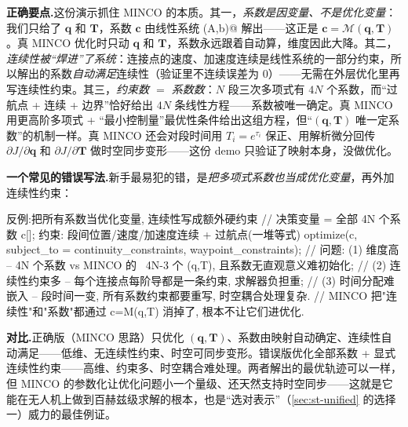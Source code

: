 \noindent\textbf{正确要点.}\;这份演示抓住 MINCO 的本质。其一，\emph{系数是因变量、不是优化变量}：我们只给了 $\mathbf q$ 和 $\mathbf T$，系数 $\mathbf c$ 由线性系统 \verb@Solve(A,b)@ 解出——这正是 $\mathbf c=\mathcal M(\mathbf q,\mathbf T)$。真 MINCO 优化时只动 $\mathbf q$ 和 $\mathbf T$，系数永远跟着自动算，维度因此大降。其二，\emph{连续性被“焊进”了系统}：连接点的速度、加速度连续是线性系统的一部分约束，所以解出的系数\emph{自动满足}连续性（验证里不连续误差为 $0$）——无需在外层优化里再写连续性约束。其三，\emph{约束数 $=$ 系数数}：$N$ 段三次多项式有 $4N$ 个系数，而“过航点 + 连续 + 边界”恰好给出 $4N$ 条线性方程——系数被唯一确定。真 MINCO 用更高阶多项式 + “最小控制量”最优性条件给出这组方程，但“$(\mathbf q,\mathbf T)$ 唯一定系数”的机制一样。真 MINCO 还会对段时间用 $T_i=e^{\tau_i}$ 保正、用解析微分回传 $\partial J/\partial\mathbf q$ 和 $\partial J/\partial\mathbf T$ 做时空同步变形——这份 demo 只验证了映射本身，没做优化。

\noindent{}\textbf{一个常见的错误写法.}\;新手最易犯的错，是\emph{把多项式系数也当成优化变量}，再外加连续性约束：

\begin{codebox}[C++]{反例:把所有系数当优化变量, 连续性写成额外硬约束}
// 决策变量 = 全部 4N 个系数 c[]; 约束: 段间位置/速度/加速度连续 + 过航点(一堆等式)
optimize(c, subject_to = {continuity_constraints, waypoint_constraints});
// 问题: (1) 维度高 -- 4N 个系数 vs MINCO 的 ~4N-3 个 (q,T), 且系数无直观意义难初始化;
//       (2) 连续性约束多 -- 每个连接点每阶导都是一条约束, 求解器负担重;
//       (3) 时间分配难嵌入 -- 段时间一变, 所有系数约束都要重写, 时空耦合处理复杂.
//       MINCO 把"连续性"和"系数"都通过 c=M(q,T) 消掉了, 根本不让它们进优化.
\end{codebox}

\noindent\textbf{对比.}\;正确版（MINCO 思路）只优化 $(\mathbf q,\mathbf T)$、系数由映射自动确定、连续性自动满足——低维、无连续性约束、时空可同步变形。错误版优化全部系数 + 显式连续性约束——高维、约束多、时空耦合难处理。两者解出的最优轨迹可以一样，但 MINCO 的参数化让优化问题小一个量级、还天然支持时空同步——这就是它能在无人机上做到百赫兹级求解的根本，也是“选对表示”（\cref{sec:st-unified} 的选择一）威力的最佳例证。

